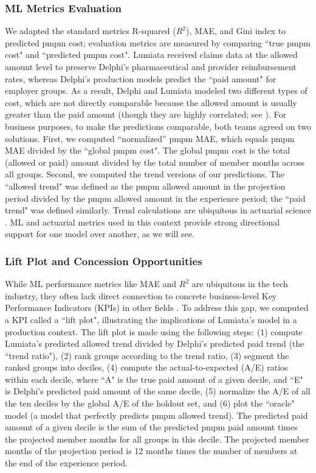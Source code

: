 \documentclass[letterpaper]{article} %
\begin{document}
\subsubsection{ML Metrics Evaluation}
We adapted the standard metrics R-squared ($R^{2}$), MAE, and Gini index \cite{gini} to predicted pmpm cost; evaluation metrics are measured by comparing ``true pmpm cost" and ``predicted pmpm cost". Lumiata received claims data at the allowed amount level to preserve Delphi's pharmaceutical and provider reimbursement rates, whereas Delphi's production models predict the ``paid amount" for employer groups. As a result, Delphi and Lumiata modeled two different types of cost, which are not directly comparable because the allowed amount is usually greater than the paid amount (though they are highly correlated; see \citeauthor{AccRisk} \citeyear{AccRisk}). For business purposes, to make the predictions comparable, both teams agreed on two solutions. First, we computed ``normalized'' pmpm MAE, which equals pmpm MAE divided by the ``global pmpm cost". The global pmpm cost is the total (allowed or paid) amount divided by the total number of member months across all groups.  Second, we computed the trend versions of our predictions. The ``allowed trend" was defined as the pmpm allowed amount in the projection period divided by the pmpm allowed amount in the experience period; the ``paid trend" was defined similarly.  Trend calculations are ubiquitous in actuarial science \cite{SOATrend}.  ML and actuarial metrics used in this context provide strong directional support for one model over another, as we will see.





\subsubsection{Lift Plot and Concession Opportunities}
While ML performance metrics like MAE and $R^{2}$ are ubiquitous in the tech industry, they often lack direct connection to concrete business-level Key Performance Indicators (KPIs) in other fields \cite{AnaTransl}. To address this gap, we computed a KPI called a ``lift plot", illustrating the implications of Lumiata's model in a production context. The lift plot is made using the following steps: (1) compute Lumiata's predicted allowed trend divided by Delphi's predicted paid trend (the ``trend ratio"),
(2) rank groups according to the trend ratio,
(3) segment the ranked groups into deciles,
(4) compute the actual-to-expected (A/E) ratios within each decile, where ``A" is the true paid amount of a given decile, and ``E" is Delphi's predicted paid amount of the same decile,
(5) normalize the A/E of all the ten deciles by the global A/E of the holdout set, and
(6) plot the ``oracle" model (a model that perfectly predicts pmpm allowed trend).
The predicted paid amount of a given decile is the sum of the predicted pmpm paid amount times the projected member months for all groups in this decile.  The projected member months of the projection period is 12 months times the number of members at the end of the experience period.
\end{document}
